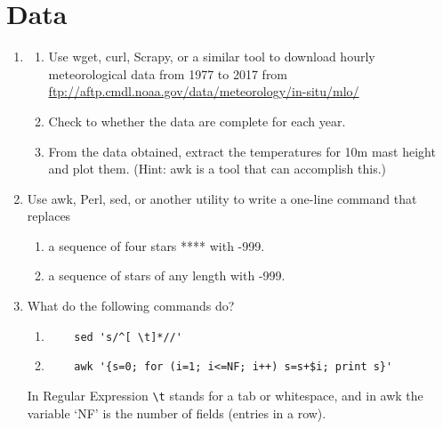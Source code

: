 \documentclass{article}
\begin{document}
\section{Data}
\begin{enumerate}
  
\item \label{exrc:wgetmlo} 
  \begin{enumerate}\setlength{\itemsep}{0pt}
  \item Use wget, curl, Scrapy, or a similar tool to download hourly meteorological data from 1977 to 2017 from \url{ftp://aftp.cmdl.noaa.gov/data/meteorology/in-situ/mlo/}

  \item Check to whether the data are complete for each year.
    
  \item From the data obtained, extract the temperatures for 10m mast height and plot them.
    (Hint: awk is a tool that can accomplish this.)
  \end{enumerate}


\item Use awk, Perl, sed, or another utility to write a one-line command that replaces
  \begin{enumerate}\setlength{\itemsep}{0pt}
  \item a sequence of four stars **** with -999.
  \item a sequence of stars of any length with -999.
  \end{enumerate}


\item What do the following commands do?
  \begin{enumerate}\setlength{\itemsep}{0pt}
  \item
\begin{verbatim}
    sed 's/^[ \t]*//' 
\end{verbatim}
  \item
\begin{verbatim}
    awk '{s=0; for (i=1; i<=NF; i++) s=s+$i; print s}'
\end{verbatim}
\end{enumerate}
In Regular Expression \verb+\t+ stands for a tab or whitespace,
and in awk the variable `NF' is the number of fields (entries in a row).


\end{enumerate}
\end{document}
